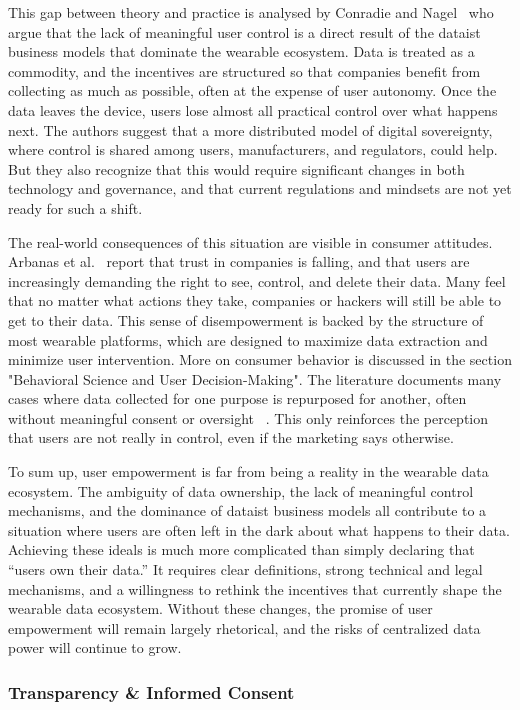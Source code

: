	This gap between theory and practice is analysed by Conradie and Nagel~\cite{Conradie2022} who argue that the lack of meaningful user control is a direct result of the dataist business models that dominate the wearable ecosystem. Data is treated as a commodity, and the incentives are structured so that companies benefit from collecting as much as possible, often at the expense of user autonomy. Once the data leaves the device, users lose almost all practical control over what happens next. The authors suggest that a more distributed model of digital sovereignty, where control is shared among users, manufacturers, and regulators, could help. But they also recognize that this would require significant changes in both technology and governance, and that current regulations and mindsets are not yet ready for such a shift.

	The real-world consequences of this situation are visible in consumer attitudes. Arbanas et al.~\cite{Arbanas2023} report that trust in companies is falling, and that users are increasingly demanding the right to see, control, and delete their data. Many feel that no matter what actions they take, companies or hackers will still be able to get to their data. This sense of disempowerment is backed by the structure of most wearable platforms, which are designed to maximize data extraction and minimize user intervention. More on consumer behavior is discussed in the section "Behavioral Science and User Decision-Making". The literature documents many cases where data collected for one purpose is repurposed for another, often without meaningful consent or oversight ~\cite{Sui2023}. This only reinforces the perception that users are not really in control, even if the marketing says otherwise.

	To sum up, user empowerment is far from being a reality in the wearable data ecosystem. The ambiguity of data ownership, the lack of meaningful control mechanisms, and the dominance of dataist business models all contribute to a situation where users are often left in the dark about what happens to their data. Achieving these ideals is much more complicated than simply declaring that “users own their data.” It requires clear definitions, strong technical and legal mechanisms, and a willingness to rethink the incentives that currently shape the wearable data ecosystem. Without these changes, the promise of user empowerment will remain largely rhetorical, and the risks of centralized data power will continue to grow.
	\subsubsection{Transparency \& Informed Consent}

